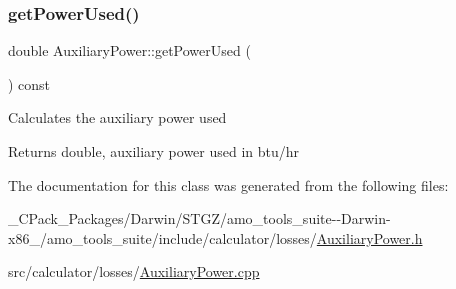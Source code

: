 \subsubsection{\texorpdfstring{get\+Power\+Used()}{getPowerUsed()}\hspace{0.1cm}{\footnotesize\ttfamily [3/3]}}
{\footnotesize\ttfamily double Auxiliary\+Power\+::get\+Power\+Used (\begin{DoxyParamCaption}{ }\end{DoxyParamCaption}) const}

Calculates the auxiliary power used

\begin{DoxyReturn}{Returns}
double, auxiliary power used in btu/hr 
\end{DoxyReturn}


The documentation for this class was generated from the following files\+:\begin{DoxyCompactItemize}
\item 
\+\_\+\+C\+Pack\+\_\+\+Packages/\+Darwin/\+S\+T\+G\+Z/amo\+\_\+tools\+\_\+suite-\/-\/\+Darwin-\/x86\+\_/amo\+\_\+tools\+\_\+suite/include/calculator/losses/\hyperlink{___c_pack___packages_2_darwin_2_s_t_g_z_2amo__tools__suite--_darwin-x86__64_2amo__tools__suite_2267aa3bc123e671ea39c318431c8657a}{Auxiliary\+Power.\+h}\item 
src/calculator/losses/\hyperlink{_auxiliary_power_8cpp}{Auxiliary\+Power.\+cpp}\end{DoxyCompactItemize}
